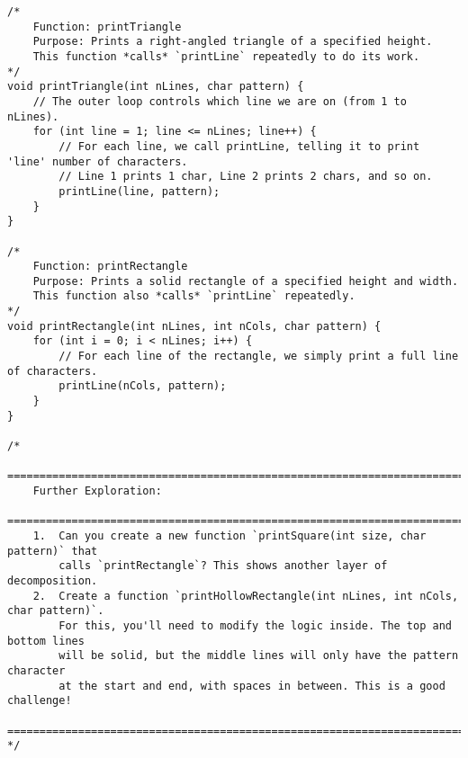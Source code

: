 \documentclass[11pt]{book}
\begin{document}
\begin{verbatim}
/*
    Function: printTriangle
    Purpose: Prints a right-angled triangle of a specified height.
    This function *calls* `printLine` repeatedly to do its work.
*/
void printTriangle(int nLines, char pattern) {
    // The outer loop controls which line we are on (from 1 to nLines).
    for (int line = 1; line <= nLines; line++) {
        // For each line, we call printLine, telling it to print 'line' number of characters.
        // Line 1 prints 1 char, Line 2 prints 2 chars, and so on.
        printLine(line, pattern);
    }
}

/*
    Function: printRectangle
    Purpose: Prints a solid rectangle of a specified height and width.
    This function also *calls* `printLine` repeatedly.
*/
void printRectangle(int nLines, int nCols, char pattern) {
    for (int i = 0; i < nLines; i++) {
        // For each line of the rectangle, we simply print a full line of characters.
        printLine(nCols, pattern);
    }
}

/*
    ================================================================================
    Further Exploration:
    ================================================================================
    1.  Can you create a new function `printSquare(int size, char pattern)` that
        calls `printRectangle`? This shows another layer of decomposition.
    2.  Create a function `printHollowRectangle(int nLines, int nCols, char pattern)`.
        For this, you'll need to modify the logic inside. The top and bottom lines
        will be solid, but the middle lines will only have the pattern character
        at the start and end, with spaces in between. This is a good challenge!
    ================================================================================
*/

\end{verbatim}
\clearpage
\end{document}
